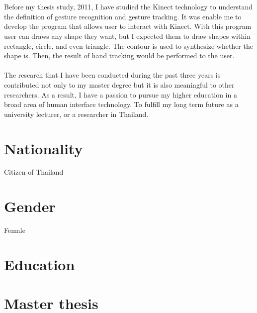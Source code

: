\documentclass[11pt,a4paper,roman]{moderncv}        %
\begin{document}
\\
\\
Before my thesis study, 2011, I have studied the Kinect technology to understand the definition of gesture recognition and gesture tracking. It was enable me to develop the program that allows user to interact with Kinect. With this program user can draws any shape they want, but I expected them to draw shapes within rectangle, circle, and even triangle. The contour is used to synthesize whether the shape is. Then, the result of hand tracking would be performed to the user. 
\\
\\
The research that I have been conducted during the past three years is contributed not only to my master degree but it is also meaningful to other researchers. As a result, I have a passion to pursue my higher education in a broad area of human interface technology. To fulfill my long term future as a university lecturer, or a researcher in Thailand. 
		

\clearpage

\makecvtitle
\section{Nationality}
Citizen of Thailand

\section{Gender}
Female

\section{Education}

\section{Master thesis}
\end{document}
